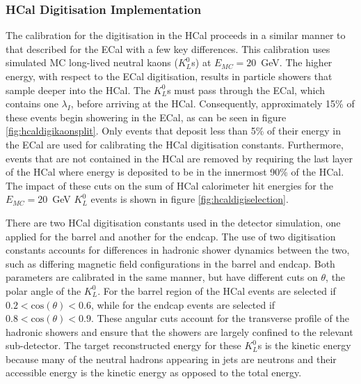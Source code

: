 
\subsubsection{HCal Digitisation Implementation}
\label{sec:hcaldigi}
The calibration for the digitisation in the HCal proceeds in a similar manner to that described for the ECal with a few key differences.  This calibration uses simulated MC long-lived neutral kaons ($K^{0}_{L}$s) at $E_{MC} = 20$~GeV.  The higher energy, with respect to the ECal digitisation, results in particle showers that sample deeper into the HCal.  The $K^{0}_{L}$s must pass through the ECal, which contains one $\lambda_{I}$, before arriving at the HCal.  Consequently, approximately 15\% of these events begin showering in the ECal, as can be seen in figure \ref{fig:hcaldigikaonsplit}.  Only events that deposit less than 5\% of their energy in the ECal are used for calibrating the HCal digitisation constants.  Furthermore, events that are not contained in the HCal are removed by requiring the last layer of the HCal where energy is deposited to be in the innermost 90\% of the HCal.  The impact of these cuts on the sum of HCal calorimeter hit energies for the $E_{MC} = 20$~GeV $K^{0}_{L}$ events is shown in figure \ref{fig:hcaldigiselection}.  

There are two HCal digitisation constants used in the detector simulation, one applied for the barrel and another for the endcap.  The use of two digitisation constants accounts for differences in hadronic shower dynamics between the two, such as differing magnetic field configurations in the barrel and endcap.  Both parameters are calibrated in the same manner, but have different cuts on $\theta$, the polar angle of the $K^{0}_{L}$.  For the barrel region of the HCal events are selected if $0.2 < \text{cos}(\theta) < 0.6$, while for the endcap events are selected if $0.8 < \text{cos}(\theta) < 0.9$.  These angular cuts account for the transverse profile of the hadronic showers and ensure that the showers are largely confined to the relevant sub-detector.  The target reconstructed energy for these $K^{0}_{L}$s is the kinetic energy because many of the neutral hadrons appearing in jets are neutrons and their accessible energy is the kinetic energy \cite{Wigmans:2000vf} as opposed to the total energy.  

